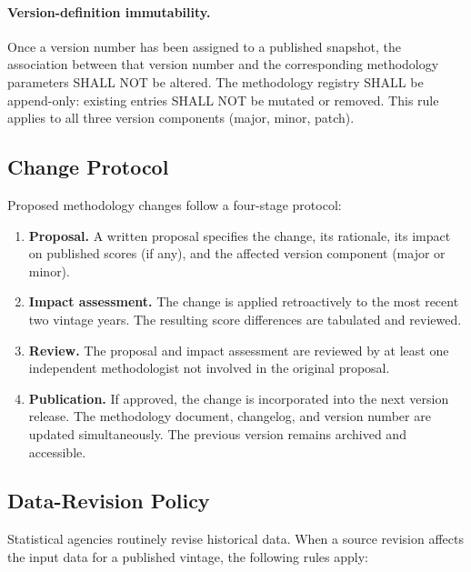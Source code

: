 \paragraph{Version-definition immutability.}
Once a version number has been assigned to a published snapshot, the
association between that version number and the corresponding methodology
parameters SHALL NOT be altered.  The methodology registry SHALL be
append-only: existing entries SHALL NOT be mutated or removed.  This
rule applies to all three version components (major, minor, patch).

\subsection{Change Protocol}\label{sec:gov:change}

Proposed methodology changes follow a four-stage protocol:

\begin{enumerate}
  \item \textbf{Proposal.}  A written proposal specifies the change, its
    rationale, its impact on published scores (if any), and the affected
    version component (major or minor).
  \item \textbf{Impact assessment.}  The change is applied retroactively to
    the most recent two vintage years.  The resulting score differences are
    tabulated and reviewed.
  \item \textbf{Review.}  The proposal and impact assessment are reviewed by
    at least one independent methodologist not involved in the original
    proposal.
  \item \textbf{Publication.}  If approved, the change is incorporated into
    the next version release.  The methodology document, changelog, and
    version number are updated simultaneously.  The previous version remains
    archived and accessible.
\end{enumerate}

\subsection{Data-Revision Policy}\label{sec:gov:revision}

Statistical agencies routinely revise historical data.  When a source
revision affects the input data for a published vintage, the following rules
apply:

